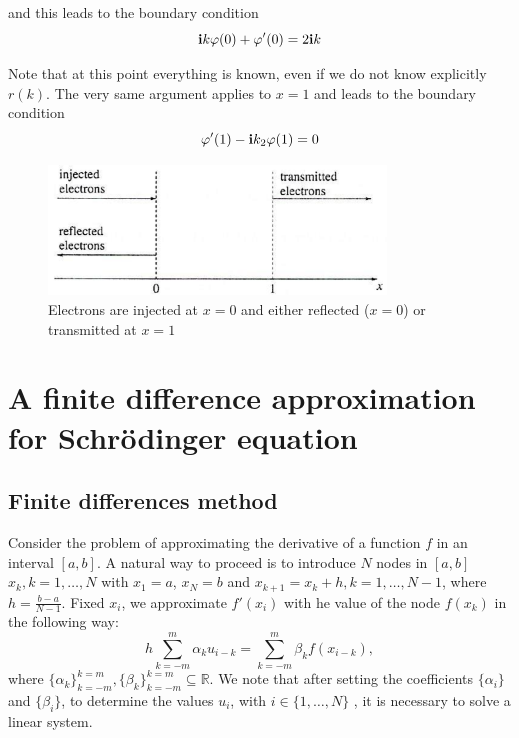 \documentclass[12pt,a4paper,onecolumn]{article}
\theoremstyle{definition}
\theoremstyle{plain}
\newcommand{\var}{\varphi}
\newcommand{\numberset}{\mathbb}
\newcommand{\R}{\numberset{R}}
\begin{document}
and this leads to the boundary condition 
\[
 \bold{i} k \var(0)+\var'(0)=2\bold{i}k
 \]

Note that at this point everything is known, even if we do not know explicitly $r(k)$. The very same argument applies to $x=1$ and leads to the boundary condition 
\[ 
\varphi'(1) - \bold{i} k_2\varphi(1)=0
\]

\begin{figure}[h!]
	\centering
	  \includegraphics[width=0.8\textwidth]{regions.png}
	  \caption{Electrons are injected at $x=0$ and either reflected ($x=0$) or transmitted at $x=1$}
	  \label{fig:OrderConst}
\end{figure}




\section{A finite difference approximation for Schr{\"o}dinger equation}
\subsection{Finite differences method}
Consider the problem of approximating the derivative of a function $ f $ in an interval $ [a, b] $. A natural way to proceed is to introduce $N$ nodes in $ [a, b] $ $ x_k, k = 1, \dots, N $ with $ x_1 = a $, $ x_N = b $ and $ x_ {k + 1} = x_ {k} + h, k = 1, \dots, N-1 $, where $ h = \frac {b-a} {N-1} $.
Fixed $x_i$, we approximate $f'(x_i)$ with he value of the node $f(x_k)$ in the following way:
\begin{equation}
\label{eqn:somme}
h\sum_{k=-m}^{m}\alpha_{k}u_{i-k} = \sum_{k=-m}^{m} \beta_{k}f(x_{i-k}),
\end{equation}
where $\{\alpha_k\}_{k=-m}^{k=m}, \{\beta_{k}\}_{k=-m}^{k=m} \subseteq \R$.
We note that after setting the coefficients $\{\alpha_i\}$ and $\{\beta_i\}$, to determine the values $u_i$, with $i\in\{1,\dots,N\}$ , it is necessary to solve a linear system. 
\end{document}
